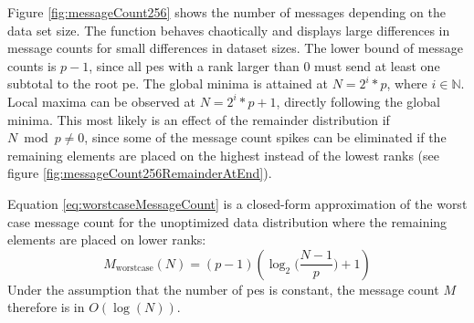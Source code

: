 Figure \ref{fig:messageCount256} shows the number of messages depending on the data set size.
The function behaves chaotically and displays large differences in message counts for small differences in dataset sizes.
The lower bound of message counts is $p - 1$, since all \glspl{pe} with a rank larger than $0$ must send at least one subtotal to the root \gls{pe}.
The global minima is attained at $N = 2^i * p$, where $i \in \mathbb{N}$.
Local maxima can be observed at $N = 2^i * p + 1$, directly following the global minima.
This most likely is an effect of the remainder distribution if $N \bmod p \neq 0$, since some of the message count spikes can be eliminated if the remaining elements are placed on the highest instead of the lowest ranks (see figure \ref{fig:messageCount256RemainderAtEnd}).

Equation \eqref{eq:worstcaseMessageCount} is a closed-form approximation of the worst case message count for the unoptimized data distribution where the remaining elements are placed on lower ranks:
\begin{equation}
\label{eq:worstcaseMessageCount}
M_{\textrm{worstcase}}(N) = (p - 1) (\log_2 \Big( \frac{N - 1}{p} \Big) + 1)
\end{equation}
Under the assumption that the number of \glspl{pe} is constant, the message count $M$ therefore is in $O(\log(N))$.